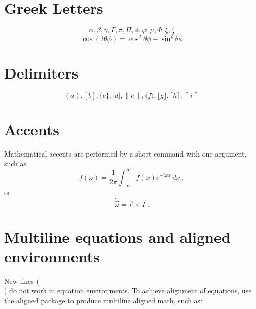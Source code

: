 \section{Greek Letters}
\[ \alpha,  \beta,  \gamma, \Gamma, \pi, \Pi, \phi, \varphi, \mu, \Phi, \xi, \zeta \]
\[ \cos(2\theta\phi) = \cos^2 \theta\phi - \sin^2 \theta\phi \]
\section{Delimiters}
\[ ( a ), [ b ], \{ c \}, | d |, \| e \|,
\langle f \rangle, \lfloor g \rfloor,
\lceil h \rceil, \ulcorner i \urcorner \]
\section{Accents}
Mathematical accents are performed by a short command with one
argument, such as
\[
        \tilde f(\omega)=\frac{1}{2\pi}
        \int_{-\infty}^\infty f(x)e^{-i\omega x}\,dx\,,
\]
or
\[
        \dot{\vec \omega}=\vec r\times\vec I\,.
\]
\section{Multiline equations and aligned environments}
New lines (\\ ) do not work in equation environments. To achieve alignment of equations, use the aligned  package to produce multiline aligned math, such as:
\newline





